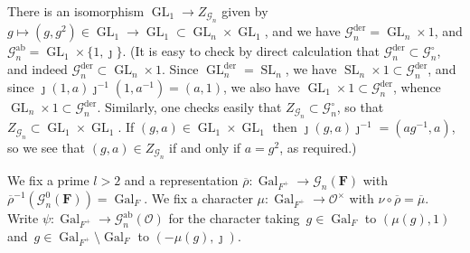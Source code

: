 \documentclass{amsart}
\renewcommand{\mathbb}{\mathbf}
\DeclareMathOperator{\SL}{SL}
\newcommand{\mubar}{\overline{\mu}}
\def\der{\mathrm{der}}
\theoremstyle{definition}
\theoremstyle{remark}
\newcommand{\mar}[1]{}
\newcommand{\mar}[1]{\marginpar{\raggedright\tiny squirrel #1}}
\newcommand{\F}{\FF}
\newcommand{\FF}{{\mathbb F}}
\newcommand{\cG}{{\mathcal G}}
\newcommand{\cO}{{\mathcal O}}
\DeclareMathOperator{\Gal}{Gal}
\DeclareMathOperator{\GL}{GL}
\newcommand{\ab}{\mathrm{ab}}
\newcommand{\rhobar}{\overline{\rho}}
\begin{document}
There is an isomorphism $\GL_1\to Z_{\cG_n}$ given by $g\mapsto
(g,g^2)\in \GL_1\to\GL_1\subset \GL_n\times\GL_1$, and we
have %
$\cG_n^\der=\GL_n\times 1$, and
$\cG_n^\ab=\GL_1\times \{1 , \jmath\}$. (It is easy to check by direct
calculation that $\cG_n^\der\subset \cG_n^\circ$, and
indeed $\cG_n^\der\subset\GL_n\times 1$. Since $\GL_n^{\der}=\SL_n$,
we have $\SL_n\times 1\subset\cG_n^\der$, and since
$\jmath(1,a)\jmath^{-1}(1,a^{-1})=(a,1)$, we also have $\GL_1\times
1\subset\cG_n^\der$, whence $\GL_n\times
1\subset\cG_n^\der$. Similarly, one checks easily that
$Z_{\cG_n}\subset \cG_n^\circ$, so that $Z_{\cG_n}\subset
\GL_1\times\GL_1$. If $(g,a)\in\GL_1\times\GL_1$ then
$\jmath(g,a)\jmath^{-1}=(ag^{-1},a)$, so we see that $(g,a)\in
Z_{\cG_n}$ if and only if $a=g^2$, as required.)

 We fix a prime $l>2$ and a representation
$\rhobar:\Gal_{F^+}\to\cG_n(\F)$ with
$\rhobar^{-1}(\cG_n^0(\F))=\Gal_F$. We fix a character $\mu:\Gal_{F^+}\to\cO^\times$ with
$\nu\circ\rhobar=\mubar$. Write $\psi:\Gal_{F^+}\to\cG_n^\ab(\cO)$ for
the character taking~$g\in \Gal_F$ to $(\mu(g),1)$
and~$g\in\Gal_{F^+}\setminus\Gal_F$ to
$(-\mu(g),\jmath)$. 
\end{document}
